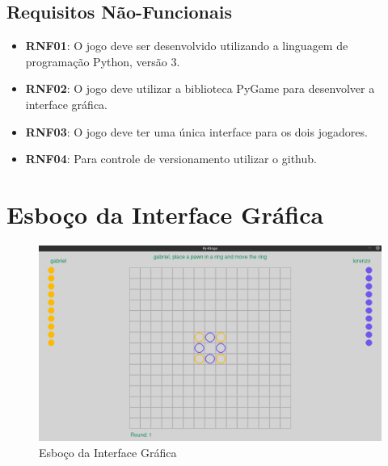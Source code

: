 \documentclass[12pt]{article}
\begin{document}
\subsection{Requisitos Não-Funcionais}
\begin{itemize}
    \item \textbf{RNF01}: O jogo deve ser desenvolvido utilizando a linguagem de programação Python, versão 3.
    \item \textbf{RNF02}: O jogo deve utilizar a biblioteca PyGame para desenvolver a interface gráfica.
    \item \textbf{RNF03}: O jogo deve ter uma única interface para os dois jogadores.
    \item \textbf{RNF04}: Para controle de versionamento utilizar o github.
\end{itemize}

\pagebreak

\section{Esboço da Interface Gráfica}
\begin{figure}[h]
    \centering
    \includegraphics[scale=0.4]{interface}
    \caption{Esboço da Interface Gráfica}
    \label{fig:interface}
\end{figure}
\end{document}
